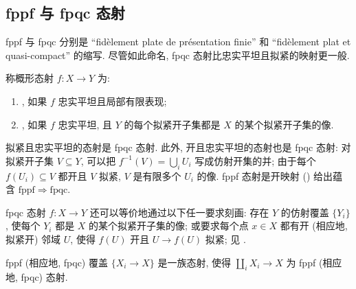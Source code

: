 \subsection{fppf 与 fpqc 态射}\label{src:A.2.4-subsection}
fppf 与 fpqc 分别是 ``fidèlement plate de présentation finie'' 和 ``fidèlement plat et quasi-compact'' 的缩写. 尽管如此命名, fpqc 态射比忠实平坦且拟紧的映射更一般.
\begin{definition}\label{src:A.2.20}
称概形态射 $f:X\to Y$ 为:
\begin{enumerate}[(1)]
\item {}, 如果 $f$ 忠实平坦且局部有限表现;
\item {}, 如果 $f$ 忠实平坦, 且 $Y$ 的每个拟紧开子集都是 $X$ 的某个拟紧开子集的像.
\end{enumerate}
\end{definition}
\begin{remark}\label{src:A.2.21}
拟紧且忠实平坦的态射是 fpqc 态射. 此外, 开且忠实平坦的态射也是 fpqc 态射: 对拟紧开子集 $V\subseteq Y$, 可以把 $f^{-1}(V)=\bigcup_i U_i$ 写成仿射开集的并; 由于每个 $f(U_i)\subseteq V$ 都开且 $V$ 拟紧, $V$ 是有限多个 $U_i$ 的像. fppf 态射是开映射 () 给出蕴含 $\mathrm{fppf}\Rightarrow\mathrm{fpqc}$.

fpqc 态射 $f:X\to Y$ 还可以等价地通过以下任一要求刻画: 存在 $Y$ 的仿射覆盖 $\{Y_i\}$, 使每个 $Y_i$ 都是 $X$ 的某个拟紧开子集的像; 或要求每个点 $x\in X$ 都有开 (相应地, 拟紧开) 邻域 $U$, 使得 $f(U)$ 开且 $U\to f(U)$ 拟紧; 见 \cite[命题 $2.33$]{Nit05}.

fppf (相应地, fpqc) 覆盖 $\{X_i\to X\}$ 是一族态射, 使得 $\coprod_i X_i\to X$ 为 fppf (相应地, fpqc) 态射.
\end{remark}

